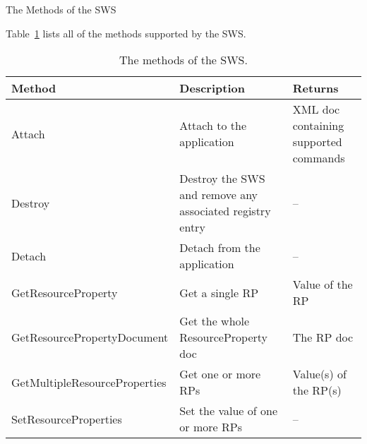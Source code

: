 \documentclass[a4paper]{article}
\begin{document}
\begin{section}{The Methods of the SWS}

Table~\ref{table:SWSmethods} lists all of the methods supported by the
SWS.

\begin{table}
\begin{center}
\begin{tabular}{l|p{4cm}|p{4cm}}
\hline\hline
Method & Description & Returns\\
\hline
Attach & Attach to the application & XML doc containing supported commands\\
Destroy& Destroy the SWS and remove any associated registry entry & --\\
Detach & Detach from the application & --\\
GetResourceProperty & Get a single RP & Value of the RP \\
GetResourcePropertyDocument & Get the whole ResourceProperty doc & The RP doc\\
GetMultipleResourceProperties & Get one or more RPs & Value(s) of the RP(s) \\
SetResourceProperties & Set the value of one or more RPs & -- \\
\hline\hline
\end{tabular}
\end{center}
\caption{The methods of the SWS.}
\label{table:SWSmethods}
\end{table}

\end{section}
\end{document}
